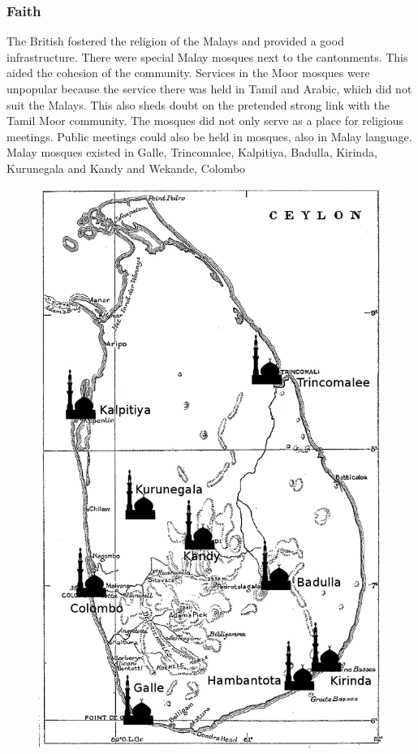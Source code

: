 \subsubsection{Faith}\label{sec:slmbg:Faith}
The British fostered the religion of the Malays and provided a
good infrastructure. There were special Malay mosques next to the
cantonments. This aided the cohesion of the community. Services in
the Moor mosques were  unpopular because the service there was
held in Tamil and Arabic, which did not suit the Malays. This also
sheds doubt on the pretended strong link with the Tamil Moor
community. The mosques did not only serve as a place for religious
meetings. Public meetings could also be held in mosques, also in
Malay language. Malay mosques existed in Galle, Trincomalee,
Kalpitiya, Badulla, Kirinda, Kurunegala and Kandy
\citep[124]{Hussainmiya1990} and Wekande,
Colombo\citep[126f]{Hussainmiya1990}

\begin{figure}
    \centering
        \includegraphics[height=.3\textheight]{pics/malaymosque}
    \label{fig:malaymosques}
\end{figure}

